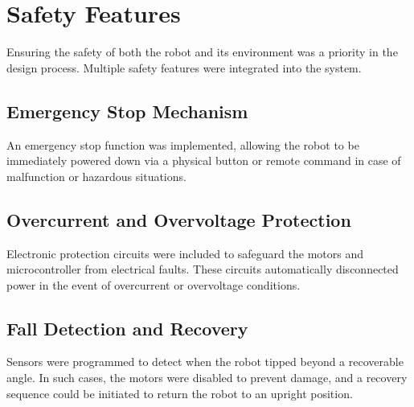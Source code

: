 \section{Safety Features}

Ensuring the safety of both the robot and its environment was a priority in the design process. Multiple safety features were integrated into the system.

\subsection{Emergency Stop Mechanism}
An emergency stop function was implemented, allowing the robot to be immediately powered down via a physical button or remote command in case of malfunction or hazardous situations.

\subsection{Overcurrent and Overvoltage Protection}
Electronic protection circuits were included to safeguard the motors and microcontroller from electrical faults. These circuits automatically disconnected power in the event of overcurrent or overvoltage conditions.

\subsection{Fall Detection and Recovery}
Sensors were programmed to detect when the robot tipped beyond a recoverable angle. In such cases, the motors were disabled to prevent damage, and a recovery sequence could be initiated to return the robot to an upright position.